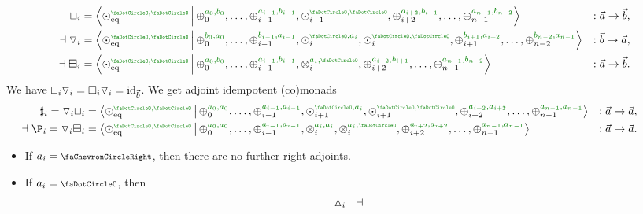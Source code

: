 \documentclass[a4paper]{memoir}
\begin{document}
\begin{example}
\begin{itemize}
\begin{itemize}
			\begin{align*}
				\cohfget_i &= \reshlist{\nonpol_\eqtydeg\pmrhom{\npolar}{\npolar}}{\pospol_0\pmrhom{a_0}{b_0}, \ldots, \pospol_{i-1}\pmrhom{a_{i-1}}{b_{i-1}}, \nonpol_{i+1}\pmrhom{\npolar}{\npolar}, \pospol_{i+2}\pmrhom{a_{i+2}}{b_{i+1}}, \ldots, \pospol_{n-1}\pmrhom{a_{n-1}}{b_{n-2}}} &: \vec a \to \vec b, \\
				\dashv
				\cohcodisc_i &= \reshlist{\nonpol_\eqtydeg\pmrhom{\npolar}{\npolar}}{\pospol_0\pmrhom{b_0}{a_0}, \ldots, \pospol_{i-1}\pmrhom{b_{i-1}}{a_{i-1}}, \nonpol_{i}\pmrhom{\npolar}{a_i}, \nonpol_{i}\pmrhom{\npolar}{\npolar}, \pospol_{i+1}\pmrhom{b_{i+1}}{a_{i+2}}, \ldots, \pospol_{n-2}\pmrhom{b_{n-2}}{a_{n-1}}} &: \vec b \to \vec a, \\
				\dashv
				\cohcopi_i &= \reshlist{\nonpol_\eqtydeg\pmrhom{\npolar}{\npolar}}{\pospol_0\pmrhom{a_0}{b_0}, \ldots, \pospol_{i-1}\pmrhom{a_{i-1}}{b_{i-1}}, \mixpol_i\pmrhom{a_i}{\npolar}, \pospol_{i+2}\pmrhom{a_{i+2}}{b_{i+1}}, \ldots, \pospol_{n-1}\pmrhom{a_{n-1}}{b_{n-2}}} &: \vec a \to \vec b.
			\end{align*}
			We have ${\sqcup}_i {\triangledown}_i = {\boxminus}_i {\triangledown}_i = \mathrm{id}_{\vec b}$. We get adjoint idempotent (co)monads
			\begin{align*}
				{}\hspace{-3em}
				\sharp_i = \cohcodisc_i \cohfget_i &= \reshlist{\nonpol_\eqtydeg\pmrhom{\npolar}{\npolar}}{\pospol_0\pmrhom{a_0}{a_0}, \ldots, \pospol_{i-1}\pmrhom{a_{i-1}}{a_{i-1}}, \nonpol_{i+1}\pmrhom{\npolar}{a_i}, \nonpol_{i+1}\pmrhom{\npolar}{\npolar}, \pospol_{i+2}\pmrhom{a_{i+2}}{a_{i+2}}, \ldots, \pospol_{n-1}\pmrhom{a_{n-1}}{a_{n-1}}} &: \vec a \to \vec a, \\
				{}\hspace{-3em}
				\dashv
				\coshp_i = \cohcodisc_i \cohcopi_i &= \reshlist{\nonpol_\eqtydeg\pmrhom{\npolar}{\npolar}}{\pospol_0\pmrhom{a_0}{a_0}, \ldots, \pospol_{i-1}\pmrhom{a_{i-1}}{a_{i-1}}, \mixpol_{i}\pmrhom{a_i}{a_i}, \mixpol_{i}\pmrhom{a_i}{\npolar}, \pospol_{i+2}\pmrhom{a_{i+2}}{a_{i+2}}, \ldots, \pospol_{n-1}\pmrhom{a_{n-1}}{a_{n-1}}} &: \vec a \to \vec a.
			\end{align*}
			\begin{itemize}
				\item If $a_i = \ypolar$, then there are no further right adjoints.
				\item If $a_i = \npolar$, then
				\[
					\begin{array}{c c c c c c c c c}
						{\vartriangle}_i
						&\dashv&

\end{array}\]
\end{itemize}
\end{itemize}
\end{itemize}
\end{example}
\end{document}
